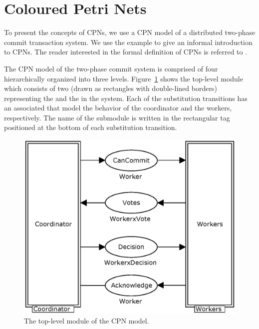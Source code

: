 \section{Coloured Petri Nets}
\label{sect:language}

To present the concepts of CPNs, we use a CPN model of a distributed
two-phase commit transaction system. We use the example to give an
informal introduction to CPNs. The reader interested in the formal
definition of CPNs is referred to \cite{newcpnbook}.


The CPN model of the two-phase commit system is comprised of four
 hierarchically organized into three
levels. Figure~\ref{fig:commit} shows the top-level module which
consists of two  (drawn as
rectangles with double-lined borders) representing the
 and the  in the system. Each of
the substitution transitions has an associated 
that model the behavior of the coordinator and the workers,
respectively. The name of the submodule is written in the rectangular
tag positioned at the bottom of each substitution transition.

\begin{figure}[b]
\centering
\includegraphics[scale=.52]{figures/Commit.eps}
\caption{The top-level module of the CPN model.}
\label{fig:commit}
\end{figure}


